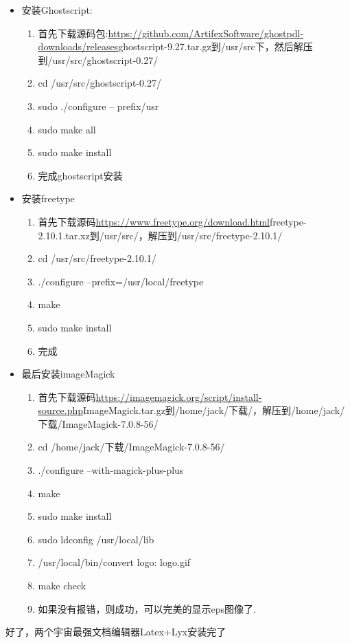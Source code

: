 \documentclass[utf8]{book}
\begin{document}
\begin{appendices}
\begin{itemize}
		\item 安装Ghostscript:
		\begin{enumerate}
			\item 首先下载源码包:\url{https://github.com/ArtifexSoftware/ghostpdl-downloads/releases}ghostscript-9.27.tar.gz到/usr/src下，然后解压到/usr/src/ghostscript-0.27/
			\item cd /usr/src/ghostscript-0.27/
			\item sudo ./configure -- prefix/usr
			\item sudo make all
			\item sudo make install
			\item 完成ghostscript安装
		\end{enumerate}
		\item 安装freetype
		\begin{enumerate}
			\item 首先下载源码\url{https://www.freetype.org/download.html}freetype-2.10.1.tar.xz到/usr/src/，解压到/usr/src/freetype-2.10.1/
			\item cd /usr/src/freetype-2.10.1/
			\item ./configure --prefix=/usr/local/freetype 
			\item make
			\item sudo make install
			\item 完成
		\end{enumerate}
		\item 最后安装imageMagick
		\begin{enumerate}
			\item 首先下载源码\url{https://imagemagick.org/script/install-source.php}ImageMagick.tar.gz到/home/jack/下载/，解压到/home/jack/下载/ImageMagick-7.0.8-56/
			\item cd /home/jack/下载/ImageMagick-7.0.8-56/
			\item ./configure --with-magick-plus-plus
			\item make
			\item sudo make install
			\item sudo ldconfig /usr/local/lib
			\item /usr/local/bin/convert logo: logo.gif
			\item make check
			\item 如果没有报错，则成功，可以完美的显示eps图像了.
		\end{enumerate}
	\end{itemize}	
	好了，两个宇宙最强文档编辑器Latex+Lyx安装完了

\end{appendices}
\end{document}

